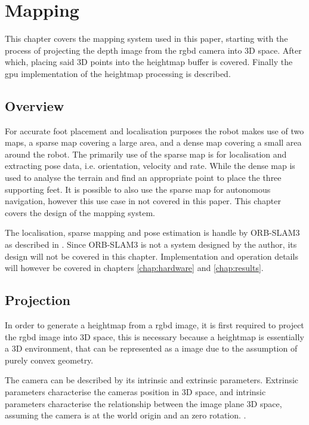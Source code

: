 \chapter{Mapping} \label{chap:mapping}
    This chapter covers the mapping system used in this paper, starting with the process of projecting the depth image from the \ac{rgbd} camera into 3D space.
    After which, placing said 3D points into the heightmap buffer is covered. Finally the \ac{gpu} implementation of the heightmap processing is described.
    \section{Overview}
        For accurate foot placement and localisation purposes the robot makes use of two maps, a sparse map covering a large area, and a dense map covering a small
        area around the robot. The primarily use of the sparse map is for localisation and extracting pose data, i.e. orientation, velocity and rate. While the dense
        map is used to analyse the terrain and find an appropriate point to place the three supporting feet.
        It is possible to also use the sparse map for autonomous navigation, however this use case in not covered in this paper.
        This chapter covers the design of the mapping system.

        The localisation, sparse mapping and pose estimation is handle by ORB-SLAM3 as described in \cite{campos2021orb}. Since ORB-SLAM3 is not a system designed by the author, its
        design will not be covered in this chapter. Implementation and operation details will however be covered in chapters \ref{chap:hardware} and \ref{chap:results}.

    \section{Projection}
        In order to generate a heightmap from a \ac{rgbd} image, it is first required to project the \ac{rgbd} image into 3D space, this is necessary because a heightmap is essentially a 3D environment,
        that can be represented as a image due to the assumption of purely convex geometry. 

        The camera can be described by its intrinsic and extrinsic parameters. Extrinsic parameters characterise the
        cameras position in 3D space, and intrinsic parameters characterise the relationship between the image plane 3D space, 
        assuming the camera is at the world origin and an zero rotation. \cite{hartley2003multiple}.

